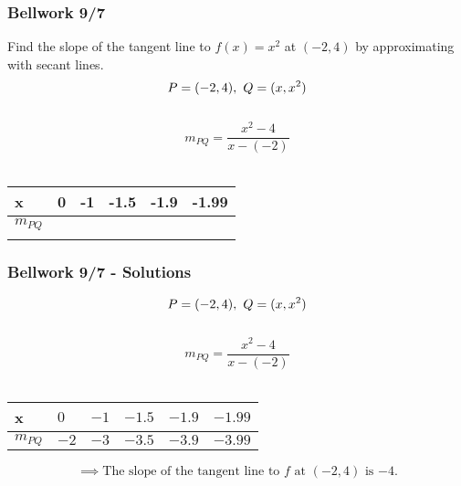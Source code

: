 \documentclass[12pt]{beamer}
\begin{document}
\begin{frame}
	\frametitle{Bellwork 9/7}
	\vspace*{\fill}
	\vspace*{\fill}
	\initclock
	Find the slope of the tangent line to $f(x)=x^2$ at $(-2,4)$ by approximating with secant lines.\\
	\vspace*{\fill}
	\[P = (-2, 4),\hspace{0.125cm}Q = (x, x^2)\]\\
	\[m_{PQ}=\frac{x^2-4}{x-(-2)}\]\\
	\begin{table}[]
		\begin{tabular}{l|l|l|l|l|l}
			\quad x  & \hspace{5px} 0 \hspace{5px} & -1 \quad & -1.5 \quad & -1.9 \quad & -1.99 \quad \\ \hline
			$m_{PQ}$ &                             &          &            &            &             \\
			         &                             &          &            &            &
		\end{tabular}
	\end{table}
	\vspace*{\fill}
	\vspace*{\fill}
	\crono
\end{frame}
\begin{frame}
	\frametitle{Bellwork 9/7 - Solutions}
	\vspace*{\fill}
	\[P = (-2, 4),\hspace{0.125cm}Q = (x, x^2)\]\\
	\[m_{PQ}=\frac{x^2-4}{x-(-2)}\]\\
	\begin{table}[]
		\begin{tabular}{l|l|l|l|l|l}
			\quad x  & \hspace{5px} $0$ \hspace{5px} & $-1$ \quad & $-1.5$ \quad & $-1.9$ \quad & $-1.99$ \quad \\ \hline
			$m_{PQ}$ & $-2$                          & $-3$       & $-3.5$       & $-3.9$       & $-3.99$
		\end{tabular}
	\end{table}
	\vspace*{\fill}
	\vspace*{\fill}
	\[\implies \text{The slope of the tangent line to $f$ at $(-2, 4)$ is $\boxed{-4}$.}\]
	\vspace*{\fill}
	\vspace*{\fill}
\end{frame}
\end{document}
